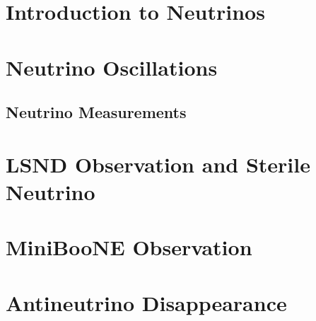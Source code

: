 
\section{Introduction to Neutrinos}

\section{Neutrino Oscillations}
\subsection{Neutrino Measurements}

\section{LSND Observation and Sterile Neutrino}
\section{MiniBooNE Observation}
\section{Antineutrino Disappearance}
